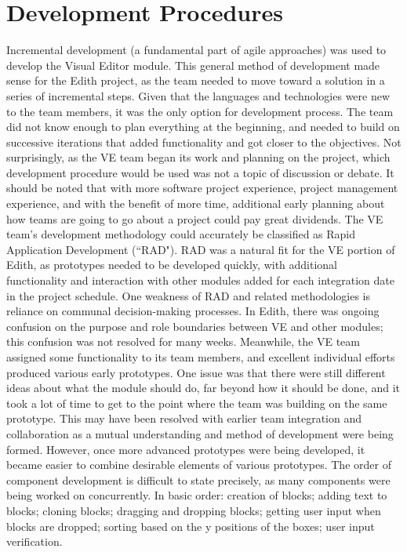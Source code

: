 \documentclass[a4paper]{article}
\begin{document}
\section{Development Procedures}
Incremental development (a fundamental part of agile approaches) was used to develop the Visual Editor module. This general method of development made sense for the Edith project, as the team needed to move toward a solution in a series of incremental steps. Given that the languages and technologies were new to the team members, it was the only option for development process. The team did not know enough to plan everything at the beginning, and needed to build on successive iterations that added functionality and got closer to the objectives. Not surprisingly, as the VE team began its work and planning on the project, which development procedure would be used was not a topic of discussion or debate. It should be noted that with more software project experience, project management experience, and with the benefit of more time, additional early planning about how teams are going to go about a project could pay great dividends. \newline \newline 
The VE team's development methodology could accurately be classified as Rapid Application Development (``RAD"). RAD was a natural fit for the VE portion of Edith, as prototypes needed to be developed quickly, with additional functionality and interaction with other modules added for each integration date in the project schedule. One weakness of RAD and related methodologies is reliance on communal decision-making processes. In Edith, there was ongoing confusion on the purpose and role boundaries between VE and other modules; this confusion was not resolved for many weeks. Meanwhile, the VE team assigned some functionality to its team members, and excellent individual efforts produced various early prototypes. One issue was that there were still different ideas about what the module should do, far beyond how it should be done, and it took a lot of time to get to the point where the team was building on the same prototype. This may have been resolved with earlier team integration and collaboration as a mutual understanding and method of development were being formed. However, once more advanced prototypes were being developed, it became easier to combine desirable elements of various prototypes. \newline \newline 
The order of component development is difficult to state precisely, as many components were being worked on concurrently. In basic order: creation of blocks; adding text to blocks; cloning blocks; dragging and dropping blocks; getting user input when blocks are dropped; sorting based on the y positions of the boxes; user input verification. \newline \newline 
\end{document}
